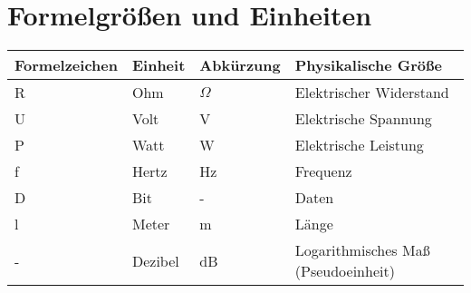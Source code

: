
\chapter*{Formelgrößen und Einheiten}
\begin{tabularx}{\textwidth}{|l|l|l|X|}
	\hline
	\textbf{Formelzeichen} 	& \textbf{Einheit}			&\textbf{Abkürzung}     		& \textbf{Physikalische Größe} \\ \hline
	R                      	& Ohm 				  		&\ensuremath{\Omega}			& Elektrischer Widerstand\hspace{10cm}  	\\   
	U                      	& Volt   					& V 							& Elektrische Spannung  	\\    
	P                      	& Watt		                & W 							& Elektrische Leistung     	\\
	f                      	& Hertz   					& Hz 							& Frequenz  				\\  
	D                      	& Bit                  		& -								& Daten     				\\
	l						& Meter						& m								& Länge						\\ 
	-						& Dezibel					& dB							& Logarithmisches Maß (Pseudoeinheit)\\
	\hline		
\end{tabularx}
\clearpage
